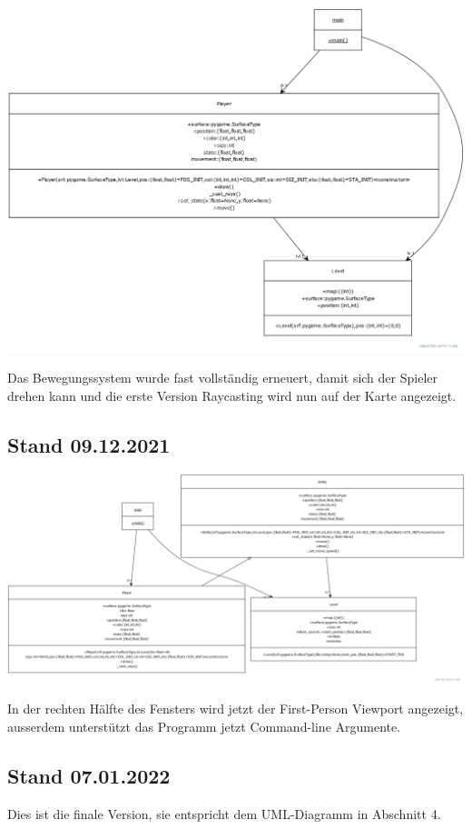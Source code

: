 \documentclass[a4paper,titlepage]{article}
\begin{document}
\includegraphics[scale=0.31]{./img/yuml-3}

Das Bewegungssystem wurde fast vollständig erneuert, damit sich der Spieler drehen kann und die erste Version Raycasting wird nun auf der Karte angezeigt.

\subsection{Stand 09.12.2021}

\includegraphics[scale=0.2]{./img/yuml-4}

In der rechten Hälfte des Fensters wird jetzt der First-Person Viewport angezeigt, ausserdem unterstützt das Programm jetzt Command-line Argumente.

\subsection{Stand 07.01.2022}

Dies ist die finale Version, sie entspricht dem UML-Diagramm in Abschnitt 4.
\end{document}
